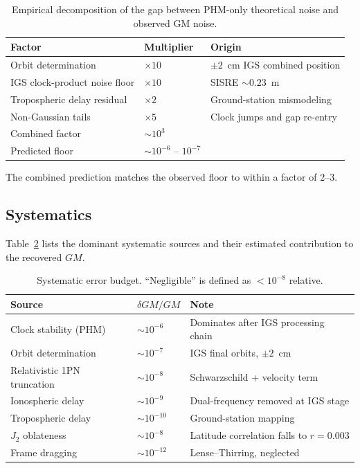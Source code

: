 \documentclass[11pt,a4paper]{article}
\begin{document}
\begin{table}[h]
    \centering
    \caption{Empirical decomposition of the gap between PHM-only theoretical noise and observed GM noise.}
    \label{tab:budget}
    \begin{tabular}{lll}
        \toprule
        Factor & Multiplier & Origin \\
        \midrule
        Orbit determination & $\times 10$ & $\pm 2$~cm IGS combined position \\
        IGS clock-product noise floor & $\times 10$ & SISRE $\sim 0.23$~m \\
        Tropospheric delay residual & $\times 2$ & Ground-station mismodeling \\
        Non-Gaussian tails & $\times 5$ & Clock jumps and gap re-entry \\
        \midrule
        Combined factor & $\sim 10^3$ & \\
        Predicted floor & $\sim 10^{-6}$ -- $10^{-7}$ & \\
        \bottomrule
    \end{tabular}
\end{table}

The combined prediction matches the observed floor to within a factor of 2--3.

\subsection{Systematics}

Table~\ref{tab:syst} lists the dominant systematic sources and their estimated contribution to the recovered $GM$.

\begin{table}[h]
    \centering
    \caption{Systematic error budget. ``Negligible'' is defined as $< 10^{-8}$ relative.}
    \label{tab:syst}
    \begin{tabular}{lll}
        \toprule
        Source & $\delta GM/GM$ & Note \\
        \midrule
        Clock stability (PHM) & $\sim 10^{-6}$ & Dominates after IGS processing chain \\
        Orbit determination & $\sim 10^{-7}$ & IGS final orbits, $\pm 2$~cm \\
        Relativistic 1PN truncation & $\sim 10^{-8}$ & Schwarzschild + velocity term \\
        Ionospheric delay & $\sim 10^{-9}$ & Dual-frequency removed at IGS stage \\
        Tropospheric delay & $\sim 10^{-10}$ & Ground-station mapping \\
        $J_2$ oblateness & $\sim 10^{-8}$ & Latitude correlation falls to $r = 0.003$ \\
        Frame dragging & $\sim 10^{-12}$ & Lense--Thirring, neglected \\
        \bottomrule
    \end{tabular}
\end{table}
\end{document}
